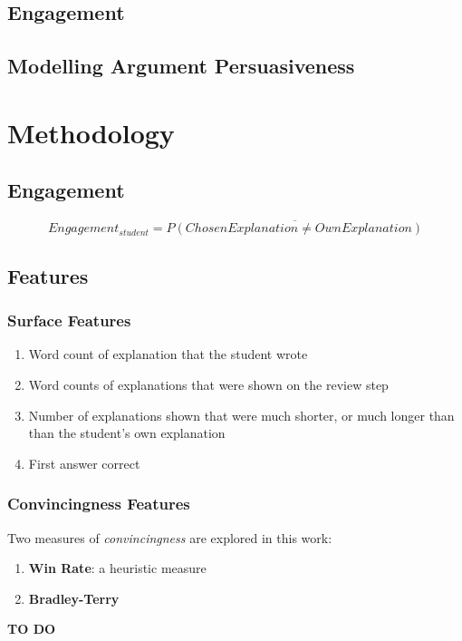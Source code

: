 \documentclass[sigconf]{acmart}
\begin{document}
\subsection{Engagement}


\subsection{Modelling Argument Persuasiveness}




\section{Methodology}



\subsection{Engagement}


\begin{equation}
Engagement_{student} = 
\overline{P(ChosenExplanation \ne 
	OwnExplanation)} 
\label{eq:engagement_choose_peer}
\end{equation}



\subsection{Features}


\subsubsection{Surface Features}

	\begin{enumerate}
	\item Word count of explanation that the student wrote 
	\item Word counts of explanations that were shown on the review step
	\item Number of explanations shown that were much shorter, or much longer 
	than than the student's own explanation 
	\item First answer correct
	\end{enumerate}


\subsubsection{Convincingness Features}
Two measures of \textit{convincingness} are explored in this work:
\begin{enumerate}
	\item \textbf{Win Rate}: a heuristic measure \cite{potash_ranking_2019}
	\item \textbf{Bradley-Terry}
\end{enumerate}


\begin{acks}
\textbf{TO DO}
\end{acks}



\end{document}
